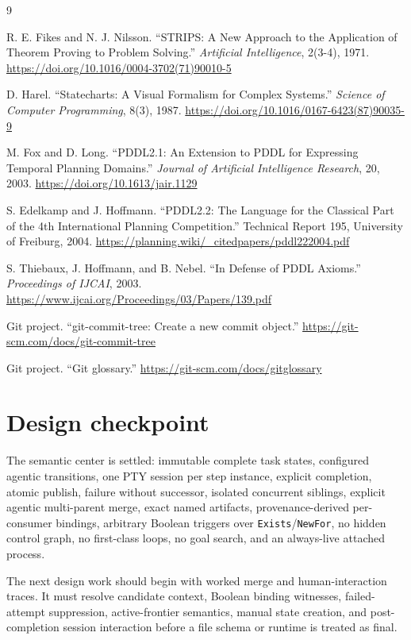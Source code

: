 \documentclass[11pt]{article}
\newcommand{\artifact}[1]{\texttt{#1}}
\begin{document}
\begin{thebibliography}{9}

R. E. Fikes and N. J. Nilsson.
``STRIPS: A New Approach to the Application of Theorem Proving to Problem Solving.''
\emph{Artificial Intelligence}, 2(3-4), 1971.
\url{https://doi.org/10.1016/0004-3702(71)90010-5}

D. Harel.
``Statecharts: A Visual Formalism for Complex Systems.''
\emph{Science of Computer Programming}, 8(3), 1987.
\url{https://doi.org/10.1016/0167-6423(87)90035-9}

M. Fox and D. Long.
``PDDL2.1: An Extension to PDDL for Expressing Temporal Planning Domains.''
\emph{Journal of Artificial Intelligence Research}, 20, 2003.
\url{https://doi.org/10.1613/jair.1129}

S. Edelkamp and J. Hoffmann.
``PDDL2.2: The Language for the Classical Part of the 4th International Planning Competition.''
Technical Report 195, University of Freiburg, 2004.
\url{https://planning.wiki/_citedpapers/pddl222004.pdf}

S. Thiebaux, J. Hoffmann, and B. Nebel.
``In Defense of PDDL Axioms.''
\emph{Proceedings of IJCAI}, 2003.
\url{https://www.ijcai.org/Proceedings/03/Papers/139.pdf}

Git project.
``git-commit-tree: Create a new commit object.''
\url{https://git-scm.com/docs/git-commit-tree}

Git project.
``Git glossary.''
\url{https://git-scm.com/docs/gitglossary}

\end{thebibliography}

\clearpage
\section*{Design checkpoint}

\begin{summarybox}
The semantic center is settled: immutable complete task states, configured agentic transitions, one PTY session per step instance, explicit completion, atomic publish, failure without successor, isolated concurrent siblings, explicit agentic multi-parent merge, exact named artifacts, provenance-derived per-consumer bindings, arbitrary Boolean triggers over \artifact{Exists}/\artifact{NewFor}, no hidden control graph, no first-class loops, no goal search, and an always-live attached process.

The next design work should begin with worked merge and human-interaction traces. It must resolve candidate context, Boolean binding witnesses, failed-attempt suppression, active-frontier semantics, manual state creation, and post-completion session interaction before a file schema or runtime is treated as final.
\end{summarybox}
\end{document}
